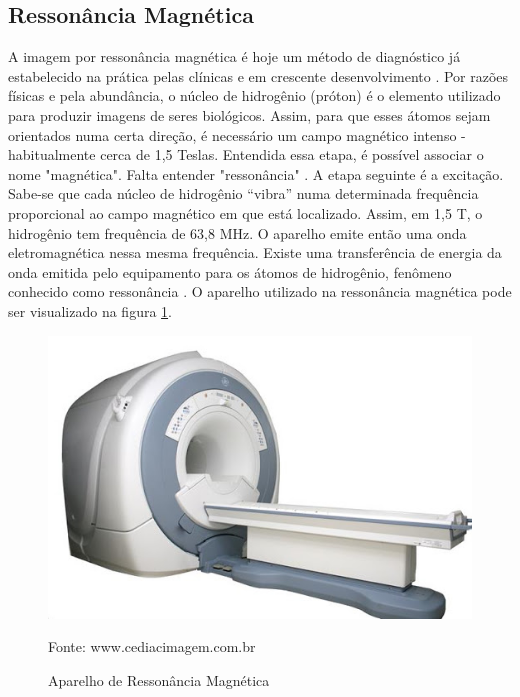 \documentclass[openright]{UFRGS} %
\begin{document}
\subsection{Ressonância Magnética}
A imagem por ressonância magnética é hoje um método de diagnóstico já estabelecido na prática  pelas clínicas e em crescente desenvolvimento . Por razões físicas e pela abundância, o núcleo de hidrogênio (próton) é o elemento utilizado para produzir imagens de seres biológicos. Assim, para que esses átomos sejam orientados numa certa direção, é necessário um campo magnético intenso - habitualmente cerca de 1,5 Teslas. Entendida essa etapa, é possível associar o nome "magnética". Falta entender "ressonância" \cite{hage2009imagem}. A etapa seguinte é a excitação. Sabe-se que cada núcleo de
hidrogênio “vibra” numa determinada frequência proporcional
ao campo magnético em que está localizado. Assim, em 1,5 T, o hidrogênio tem frequência de 63,8 MHz. O aparelho emite então uma onda eletromagnética nessa mesma frequência. Existe uma transferência de energia da onda emitida pelo equipamento para os átomos de hidrogênio, fenômeno conhecido como ressonância \cite{hage2009imagem}. O aparelho utilizado na  ressonância magnética  pode ser visualizado na figura \ref{fig:ressonaciaAparelho}.

\begin{figure}[h]
    \centering
    \caption{Aparelho de Ressonância Magnética}
    \includegraphics[scale=0.35]{figuras/ressonaciamagnetica.jpg}
    \centerline{Fonte: www.cediacimagem.com.br}
    \label{fig:ressonaciaAparelho}
\end{figure}
\end{document}

